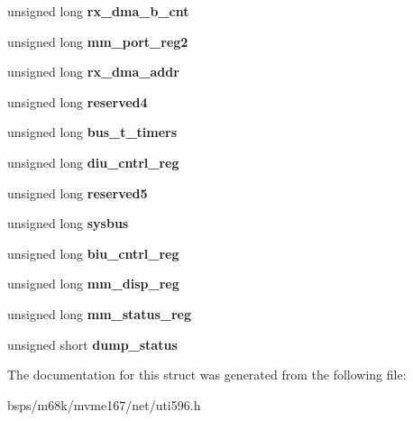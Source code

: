 \begin{DoxyCompactItemize}
unsigned long {\bfseries rx\+\_\+dma\+\_\+b\+\_\+cnt}
\item 
\mbox{\label{structi596__dump__result_a23f02cee0d19c6708e8f76c647051017}} 
unsigned long {\bfseries mm\+\_\+port\+\_\+reg2}
\item 
\mbox{\label{structi596__dump__result_a3dac46ff3ebaa7c3fecb6608bacce4ee}} 
unsigned long {\bfseries rx\+\_\+dma\+\_\+addr}
\item 
\mbox{\label{structi596__dump__result_a1c40ee48a6b47ce6fca502b4d2b4a5c4}} 
unsigned long {\bfseries reserved4}
\item 
\mbox{\label{structi596__dump__result_afc96c1725525cfbaad7ec01931ca786e}} 
unsigned long {\bfseries bus\+\_\+t\+\_\+timers}
\item 
\mbox{\label{structi596__dump__result_af6d02dc1d884bc7c63765fe9b403a0ba}} 
unsigned long {\bfseries diu\+\_\+cntrl\+\_\+reg}
\item 
\mbox{\label{structi596__dump__result_a603cceb070d6853daebfffdbc04cfa67}} 
unsigned long {\bfseries reserved5}
\item 
\mbox{\label{structi596__dump__result_ab5957622425680250f4f832a0de07cd2}} 
unsigned long {\bfseries sysbus}
\item 
\mbox{\label{structi596__dump__result_a4a2458613ee50582e27dee0c9701c85f}} 
unsigned long {\bfseries biu\+\_\+cntrl\+\_\+reg}
\item 
\mbox{\label{structi596__dump__result_aaf3b6342ec76a9f3b59a2d99465ba7ee}} 
unsigned long {\bfseries mm\+\_\+disp\+\_\+reg}
\item 
\mbox{\label{structi596__dump__result_a355d4baf7dd4dbc06fcdab4d1f0b3806}} 
unsigned long {\bfseries mm\+\_\+status\+\_\+reg}
\item 
\mbox{\label{structi596__dump__result_ad31b4e655fe302c2b89ec645c20b61da}} 
unsigned short {\bfseries dump\+\_\+status}
\end{DoxyCompactItemize}


The documentation for this struct was generated from the following file\+:\begin{DoxyCompactItemize}
\item 
bsps/m68k/mvme167/net/uti596.\+h\end{DoxyCompactItemize}
